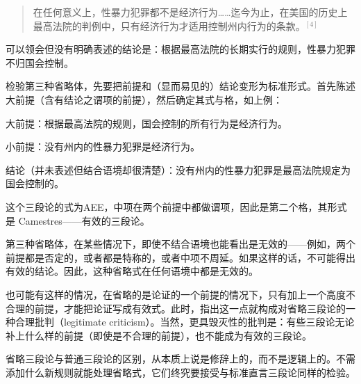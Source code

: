 \begin{quote}
在任何意义上，性暴力犯罪都不是经济行为……迄今为止，在美国的历史上最高法院的判例中，只有经济行为才适用控制州内行为的条款。${ }^{[4]}$
\end{quote}

可以领会但没有明确表述的结论是：根据最高法院的长期实行的规则，性暴力犯罪不归国会控制。

检验第三种省略体，先要把前提和（显而易见的）结论变形为标准形式。首先陈述大前提（含有结论之谓项的前提），然后确定其式与格，如上例：

大前提：根据最高法院的规则，国会控制的所有行为是经济行为。

小前提：没有州内的性暴力犯罪是经济行为。

结论（并未表述但结合语境却很清楚）：没有州内的性暴力犯罪是最高法院规定为国会控制的。

这个三段论的式为AEE，中项在两个前提中都做谓项，因此是第二个格，其形式是 Camestres——有效的三段论。

第三种省略体，在某些情况下，即使不结合语境也能看出是无效的——例如，两个前提都是否定的，或者都是特称的，或者中项不周延。如果这样的话，不可能得出有效的结论。因此，这种省略式在任何语境中都是无效的。

也可能有这样的情况，在省略的是论证的一个前提的情况下，只有加上一个高度不合理的前提，才能把论证写成有效式。此时，指出这一点就构成对省略三段论的一种合理批判（legitimate criticism）。当然，更具毁灭性的批判是：有些三段论无论补上什么样的前提（即使是不合理的前提），也不能成为有效的三段论。

省略三段论与普通三段论的区别，从本质上说是修辞上的，而不是逻辑上的。不需添加什么新规则就能处理省略式，它们终究要接受与标准直言三段论同样的检验。

